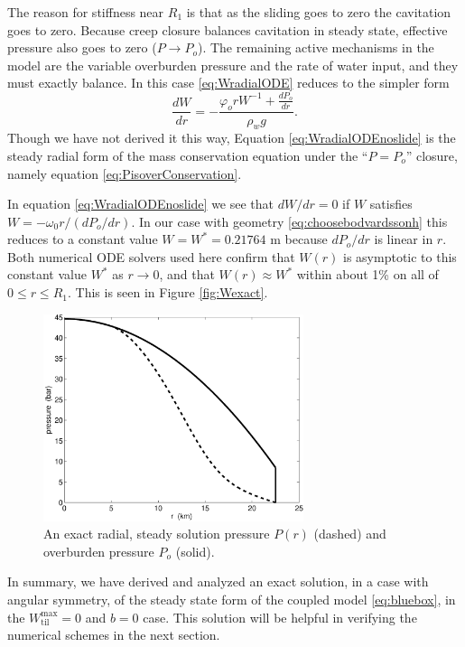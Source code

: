\documentclass[gmd]{copernicus}   %
\newcommand{\text}{\textrm}
\newcommand{\Wtilmax}{W_{\text{til}}^{\text{max}}}
\begin{document}
The reason for stiffness near $R_1$ is that as the sliding goes to zero the cavitation goes to zero.  Because creep closure balances cavitation in steady state, effective pressure also goes to zero ($P\to P_o$).  The remaining active mechanisms in the model are the variable overburden pressure and the rate of water input, and they must exactly balance.  In this case \eqref{eq:WradialODE} reduces to the simpler form
\begin{equation}
\frac{dW}{dr} = - \frac{\varphi_o r W^{-1} + \frac{dP_o}{dr}}{\rho_w g}. \label{eq:WradialODEnoslide}
\end{equation}
Though we have not derived it this way, Equation \eqref{eq:WradialODEnoslide} is the steady radial form of the mass conservation equation under the ``$P=P_o$'' closure, namely equation \eqref{eq:PisoverConservation}.

In equation \eqref{eq:WradialODEnoslide} we see that $dW/dr=0$ if $W$ satisfies $W = - \omega_0 r / (dP_o/dr)$.  In our case with geometry \eqref{eq:choosebodvardssonh} this reduces to a constant value $W=W^*= 0.21764$ m because $dP_o/dr$ is linear in $r$.  Both numerical ODE solvers used here confirm that $W(r)$ is asymptotic to this constant value $W^*$ as $r\to 0$, and that $W(r)\approx W^*$ within about 1\% on all of $0\le r \le R_1$.  This is seen in Figure \ref{fig:Wexact}.

\begin{figure}[ht]
\includegraphics[width=3.0in,keepaspectratio=true]{exact-P-plot}
\caption{An exact radial, steady solution pressure $P(r)$ (dashed) and overburden pressure $P_o$ (solid).}
\label{fig:Pexact}
\end{figure}

In summary, we have derived and analyzed an exact solution, in a case with angular symmetry, of the steady state form of the coupled model \eqref{eq:bluebox}, in the $\Wtilmax=0$ and $b=0$ case.  This solution will be helpful in verifying the numerical schemes in the next section.
\end{document}
